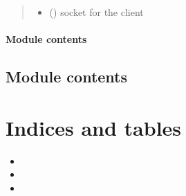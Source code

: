 \documentclass[letterpaper,10pt,english]{sphinxmanual}
\begin{document}
\begin{fulllineitems}
\begin{fulllineitems}
\begin{quote}
\begin{description}
\begin{itemize}
\item {} 
 () \textendash{} socket for the client

\end{itemize}

\end{description}\end{quote}

\end{fulllineitems}


\end{fulllineitems}


\begin{fulllineitems}
\label{\detokenize{bbc1.core.user_message_routing:bbc1.core.user_message_routing.direct_send_to_user}}
\end{fulllineitems}



\subsubsection{Module contents}
\label{\detokenize{bbc1.core:module-contents}}\label{\detokenize{bbc1.core:module-bbc1.core}}

\section{Module contents}
\label{\detokenize{bbc1:module-contents}}\label{\detokenize{bbc1:module-bbc1}}

\chapter{Indices and tables}
\label{\detokenize{index:indices-and-tables}}\begin{itemize}
\item {} 

\item {} 

\item {} 

\end{itemize}
\end{document}
